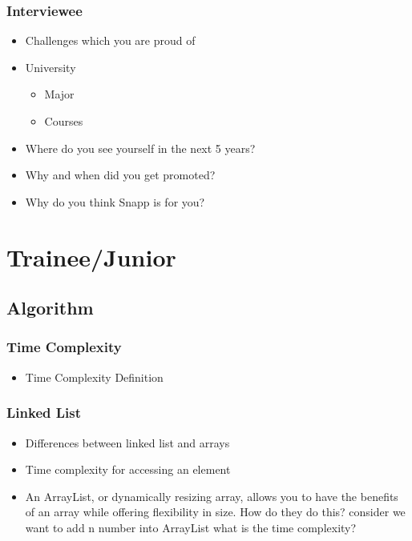 \documentclass[]{book}
\begin{document}
\subsection{Interviewee}

\begin{itemize}
  \item Challenges which you are proud of
  \item University
    \begin{itemize}
      \item Major
      \item Courses
    \end{itemize}
  \item Where do you see yourself in the next 5 years?
  \item Why and when did you get promoted?
  \item Why do you think Snapp is for you?
\end{itemize}

\chapter{Trainee/Junior}

\section{Algorithm}

\subsection{Time Complexity}

\begin{itemize}
  \item Time Complexity Definition
\end{itemize}

\subsection{Linked List}

\begin{itemize}
  \item Differences between linked list and arrays
  \item Time complexity for accessing an element
  \item An ArrayList, or dynamically resizing array, allows you to have the benefits of an array while offering flexibility in size.
    How do they do this? consider we want to add n number into ArrayList what is the time complexity?
\end{itemize}
\end{document}
